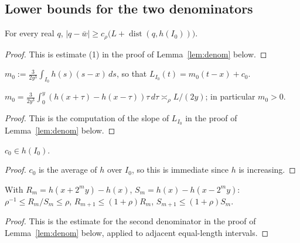 \subsection{Lower bounds for the two denominators}

\begin{lemma}\label{lem:dist_conj_lower_bound}
	\leanok
	For every real $q$, $|q-\bar w|\ge c_\rho\bigl(L+\operatorname{dist}(q,h(I_0))\bigr)$.
\end{lemma}
\begin{proof}
	This is estimate (1) in the proof of Lemma~\ref{lem:denom} below.
\end{proof}

\begin{definition}\label{def:l2ProjSlope}
	$m_0:=\tfrac3{2y^3}\int_{I_0}h(s)(s-x)\,ds$, so that $L_{I_0}(t)=m_0(t-x)+c_0$.
\end{definition}

\begin{lemma}[Slope of $L_{I_0}$]\label{lem:l2ProjSlope_comparable}
	\leanok
	$m_0=\tfrac3{2y^3}\int_0^y(h(x+\tau)-h(x-\tau))\tau\,d\tau\asymp_\rho L/(2y)$; in particular $m_0>0$.
\end{lemma}
\begin{proof}
	This is the computation of the slope of $L_{I_0}$ in the proof of Lemma~\ref{lem:denom} below.
\end{proof}

\begin{lemma}[Position of $c_0$]\label{lem:intervalAvg_mem_image}
	\leanok
	$c_0\in h(I_0)$.
\end{lemma}
\begin{proof}
	$c_0$ is the average of $h$ over $I_0$, so this is immediate since $h$ is increasing.
\end{proof}

\begin{lemma}\label{lem:qs_dyadic_growth}
	\leanok
	With $R_m=h(x+2^my)-h(x)$, $S_m=h(x)-h(x-2^my)$: $\rho^{-1}\le R_m/S_m\le\rho$, $R_{m+1}\le(1+\rho)R_m$, $S_{m+1}\le(1+\rho)S_m$.
\end{lemma}
\begin{proof}
	This is the estimate for the second denominator in the proof of Lemma~\ref{lem:denom} below, applied to adjacent equal-length intervals.
\end{proof}

